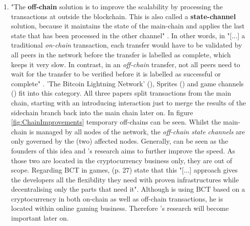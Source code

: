 \begin{enumerate}
	\item "The \textbf{off-chain} solution is to improve the scalability by processing the transactions at outside the blockchain.
	This is also called a \textbf{state-channel} solution, because it maintains the state of the main-chain and applies the last state that has been processed in the other channel" \cite[1205]{Kim.2018}.
	In other words, in "[...] a traditional \textit{on-chain} transaction, each transfer would have to be validated by all peers
	in the network before the transfer is labelled as complete, which keeps it very slow.
	In contrast, in an \textit{off-chain} transfer, not all peers need to wait for the transfer to be verified before it is labelled as successful or complete" \cite[15]{Sharma.2020}.
	'The Bitcoin Lightning Network' (\citet{Poon.2016}), Sprites (\citet{Miller.2017}) and game channels (\citet{Kraft.2016}) fit into this category.
	All three papers split transactions from the main chain, starting with an introducing interaction just to merge the results of the sidechain branch back into the main chain later on.
	In figure \ref{fig:ChainImprovements} temporary off-chains can be seen. 
	Whilst the main-chain is managed by all nodes of the network,
	the \textit{off-chain state channels} are only governed by the (two) affected nodes.
	Generally, \citet{Poon.2016} can be seen as the founders of
	this idea and \citet{Miller.2017}'s research aims to further improve the speed.
	As those two are located in the cryptocurrency business only, they are out of scope.
	Regarding \gls{BCT} in games, \citet{Laneve.2019} (p. 27) state that this "[...] approach gives the developers all the flexibility they need with proven infrastructures while decentralising only the parts that need it".
	Although \citet{Kraft.2016} is using \gls{BCT} based on a cryptocurrency in both on-chain as well as off-chain transactions, he is located within online gaming business.
	Therefore \citet{Kraft.2016}'s research will become important later on.
	
	\begin{figure}[!b]
	\end{figure}
	

\end{enumerate}
